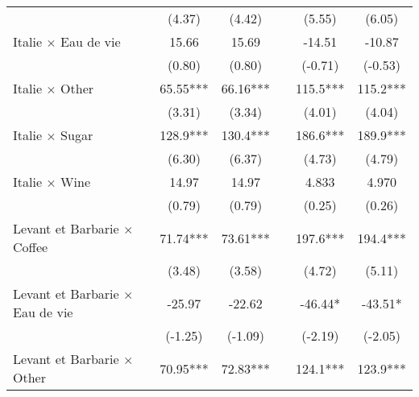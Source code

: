 {\begin{tabular}{l*{6}{c}}
                    &                     &      (4.37)         &      (4.42)         &                     &      (5.55)         &      (6.05)         \\
[1em]
Italie $\times$ Eau de vie&                     &       15.66         &       15.69         &                     &      -14.51         &      -10.87         \\
                    &                     &      (0.80)         &      (0.80)         &                     &     (-0.71)         &     (-0.53)         \\
[1em]
Italie $\times$ Other&                     &       65.55***&       66.16***&                     &       115.5***&       115.2***\\
                    &                     &      (3.31)         &      (3.34)         &                     &      (4.01)         &      (4.04)         \\
[1em]
Italie $\times$ Sugar&                     &       128.9***&       130.4***&                     &       186.6***&       189.9***\\
                    &                     &      (6.30)         &      (6.37)         &                     &      (4.73)         &      (4.79)         \\
[1em]
Italie $\times$ Wine&                     &       14.97         &       14.97         &                     &       4.833         &       4.970         \\
                    &                     &      (0.79)         &      (0.79)         &                     &      (0.25)         &      (0.26)         \\
[1em]
Levant et Barbarie $\times$ Coffee&                     &       71.74***&       73.61***&                     &       197.6***&       194.4***\\
                    &                     &      (3.48)         &      (3.58)         &                     &      (4.72)         &      (5.11)         \\
[1em]
Levant et Barbarie $\times$ Eau de vie&                     &      -25.97         &      -22.62         &                     &      -46.44*  &      -43.51*  \\
                    &                     &     (-1.25)         &     (-1.09)         &                     &     (-2.19)         &     (-2.05)         \\
[1em]
Levant et Barbarie $\times$ Other&                     &       70.95***&       72.83***&                     &       124.1***&       123.9***\\

\end{tabular}}
